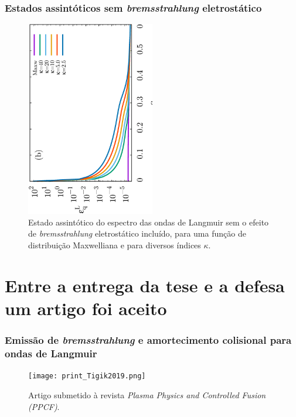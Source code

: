 \documentclass[10pt,aspectratio=1610,lualatex]{beamer}
\begin{document}
\begin{frame}
  \frametitle{Estados assintóticos sem \emph{bremsstrahlung}
    eletrostático}
  \begin{figure}
    \centering\includegraphics[width=0.5\textwidth,angle=270]{IL1D_005kvarno-brem}
    \caption*{Estado assintótico do espectro das ondas de Langmuir sem o
      efeito de \emph{bremsstrahlung} eletrostático incluído, para uma função de
      distribuição Maxwelliana e para diversos índices $\kappa$.}
  \end{figure}
\end{frame}

\section{Entre a entrega da tese e a defesa um artigo foi aceito}
\begin{frame}
  \frametitle{Emissão de \emph{bremsstrahlung} e amortecimento colisional
    para ondas de Langmuir}
  \begin{figure}
    \centering \texttt{[image: print\_Tigik2019.png]}
   \caption*{Artigo submetido à revista \emph{Plasma Physics and Controlled
      Fusion (PPCF)}.}
  \end{figure}
\end{frame}
\end{document}
